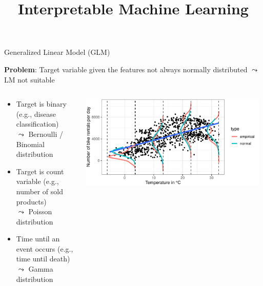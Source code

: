 \documentclass[11pt,compress,t,notes=noshow, aspectratio=169, xcolor=table]{beamer}
\title{Interpretable Machine Learning}
\date{}
\begin{document}
\newcommand{\titlefigure}{figure/logistic_marginal_temp.pdf}
\newcommand{\learninggoals}{
\item Definition of GLMs
\item Logistic regression as example
\item Interpretation in logistic regression
}



\begin{frame}{Generalized Linear Model (GLM) }

\textbf{Problem}: Target variable given the features not always normally distributed $\leadsto$ LM not suitable
\begin{columns}
    \begin{column}{0.6\textwidth}
        \begin{itemize}
            \item Target is binary (e.g., disease classification)\\
            $\leadsto$ Bernoulli / Binomial distribution
            \item Target is count variable (e.g., number of sold products)\\
            $\leadsto$ Poisson distribution
            \item Time until an event occurs (e.g., time until death)\\
            $\leadsto$ Gamma distribution
        \end{itemize}
    \end{column}
    \begin{column}{0.4\textwidth}
        \begin{center}
            \includegraphics[width = 0.98\textwidth]{figure/density_intervals.pdf}

\end{center}
\end{column}
\end{columns}
\end{frame}
\end{document}
